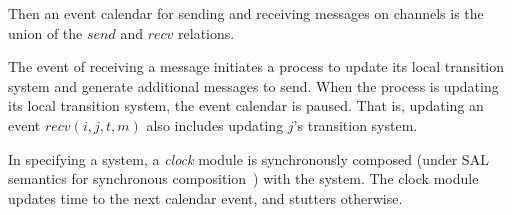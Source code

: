 \documentclass{llncs/llncs}
\newcommand{\lee}[1]{ } %
\newcommand{\lee}[1]{ {\color{blue}$<$lee: #1$>$} } %
\begin{document}
Then an event calendar for sending and receiving messages on channels is the union of the $send$ and $recv$ relations.

The event of receiving a message initiates a process to update its local transition system and generate additional messages to send. When the process is updating its local transition system, the event calendar is paused. That is, updating an event $recv(i, j, t, m)$ also includes updating $j$'s transition system.

In specifying a system, a \emph{clock} module is synchronously composed (under SAL semantics for synchronous composition~\cite{SAL}) with the system. The clock module updates time to the next calendar event, and stutters otherwise.






\end{document}
